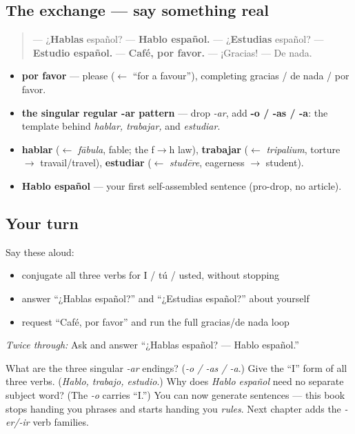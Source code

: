 \subsection*{The exchange — say something real}
\begin{quote}
— ¿\textbf{Hablas} español? — \textbf{Hablo español.} — ¿\textbf{Estudias} español? — \textbf{Estudio español.} — \textbf{Café, por favor.} — ¡Gracias! — De nada.
\end{quote}

\begin{grammarlens}[title={What you've built this chapter}]
\begin{itemize}
\raggedright
  \item \textbf{por favor} — please ($\leftarrow$ \textquotedblleft{}for a favour\textquotedblright{}), completing gracias / de nada / por favor.
  \item \textbf{the singular regular -ar pattern} — drop \emph{-ar}, add \textbf{-o / -as / -a}: the template behind \emph{hablar, trabajar,} and \emph{estudiar}.
  \item \textbf{hablar} ($\leftarrow$ \emph{fābula}, fable; the f$\to$h law), \textbf{trabajar} ($\leftarrow$ \emph{tripalium}, torture $\to$ travail/travel), \textbf{estudiar} ($\leftarrow$ \emph{studēre}, eagerness $\to$ student).
  \item \textbf{Hablo español} — your first self-assembled sentence (pro-drop, no article).
\end{itemize}
\end{grammarlens}

\subsection*{Your turn}
Say these aloud:

\begin{itemize}
\raggedright
  \item conjugate all three verbs for I / tú / usted, without stopping
  \item answer “¿Hablas español?” and “¿Estudias español?” about yourself
  \item request “Café, por favor” and run the full gracias/de nada loop
\end{itemize}

\emph{Twice through:} Ask and answer “¿Hablas español? — Hablo español.”

\begin{tcolorbox}[breakable,colback=teal!4,colframe=teal!35!black,title={Before you move on}]
What are the three singular \emph{-ar} endings? (\emph{-o / -as / -a}.) Give the “I” form of all three verbs. (\emph{Hablo, trabajo, estudio}.) Why does \emph{Hablo español} need no separate subject word? (The \emph{-o} carries “I.”) You can now generate sentences — this book stops handing you phrases and starts handing you \emph{rules}. Next chapter adds the \emph{-er/-ir} verb families.
\end{tcolorbox}
